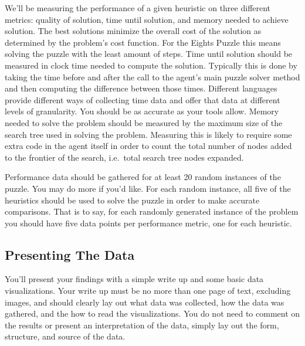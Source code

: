 \documentclass[nobib]{tufte-handout}
\begin{document}
We'll be measuring the performance of a given heuristic on three different metrics: quality of solution, time until solution, and memory needed to achieve solution.  The best solutions minimize the overall cost of the solution as determined by the problem's cost function.  For the Eights Puzzle this means solving the puzzle with the least amount of steps. Time until solution should be measured in clock time needed to compute the solution. Typically this is done by taking the time before and after the call to the agent's main puzzle solver method and then computing the difference between those times. Different languages provide different ways of collecting time data and offer that data at different levels of granularity. You should be as accurate as your tools allow. Memory needed to solve the problem should be measured by the maximum size of the search tree used in solving the problem. Measuring this is likely to require some extra code in the agent itself in order to count the total number of nodes added to the frontier of the search, i.e.\ total search tree nodes expanded.

Performance data should be gathered for at least 20 random instances of the puzzle. You may do more if you'd like. For each random instance, all five of the heuristics should be used to solve the puzzle in order to make accurate comparisons. That is to say, for each randomly generated instance of the problem you should have five data points per performance metric, one for each heuristic.

\subsection{Presenting The Data}

You'll present your findings with a simple write up and some basic data visualizations. Your write up must be no more than one page of text, excluding images, and should clearly lay out what data was collected, how the data was gathered, and the how to read the visualizations.  You do not need to comment on the results or present an interpretation of the data, simply lay out the form, structure, and source of the data.
\end{document}
